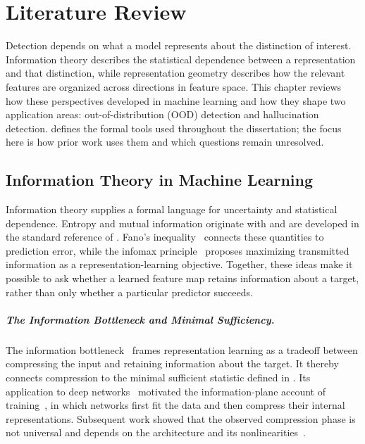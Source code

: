 \chapter{Literature Review}
\label{ch:literature-review}

Detection depends on what a model represents about the distinction of interest.
Information theory describes the statistical dependence between a representation
and that distinction, while representation geometry describes how the relevant
features are organized across directions in feature space. This chapter reviews
how these perspectives developed in machine learning and how they shape two
application areas: out-of-distribution (OOD) detection and hallucination detection.
 defines the formal tools used throughout the dissertation;
the focus here is how prior work uses them and which questions remain unresolved.

\section{Information Theory in Machine Learning}
\label{sec:lit:infotheory}

Information theory supplies a formal language for uncertainty and statistical
dependence. Entropy and mutual information originate with
\citet{shannon1948mathematical} and are developed in the standard reference of
\citet{cover1999elements}. Fano's inequality~\citep{robert1952fano} connects these
quantities to prediction error, while the infomax principle~\citep{linsker1988self}
proposes maximizing transmitted information as a representation-learning
objective. Together, these ideas make it possible to ask whether a learned feature
map retains information about a target, rather than only whether a particular
predictor succeeds.

\paragraph{The Information Bottleneck and Minimal Sufficiency.}
The information bottleneck~\citep{tishby2000information} frames representation
learning as a tradeoff between compressing the input and retaining information
about the target. It thereby connects compression to the minimal sufficient
statistic defined in . Its application to deep
networks~\citep{tishby2015deep} motivated the information-plane account of
training~\citep{shwartz2017opening}, in which networks first fit the data and then
compress their internal representations. Subsequent work showed that the observed
compression phase is not universal and depends on the architecture and its
nonlinearities~\citep{saxe2019information}.


